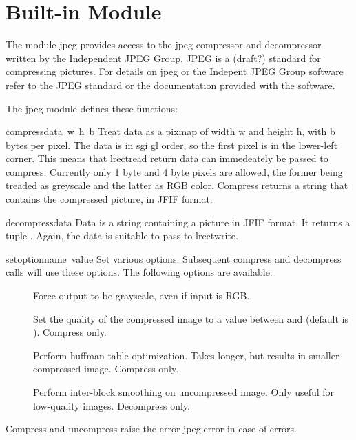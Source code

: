 \section{Built-in Module }

The module jpeg provides access to the jpeg compressor and
decompressor written by the Independent JPEG Group. JPEG is a (draft?)
standard for compressing pictures.  For details on jpeg or the
Indepent JPEG Group software refer to the JPEG standard or the
documentation provided with the software.

The jpeg module defines these functions:

\renewcommand{\indexsubitem}{(in module jpeg)}
\begin{funcdesc}{compress}{data\, w\, h\, b}
Treat data as a pixmap of width w and height h, with b bytes per
pixel.  The data is in sgi gl order, so the first pixel is in the
lower-left corner. This means that lrectread return data can
immedeately be passed to compress.  Currently only 1 byte and 4 byte
pixels are allowed, the former being treaded as greyscale and the
latter as RGB color.  Compress returns a string that contains the
compressed picture, in JFIF format.
\end{funcdesc}

\begin{funcdesc}{decompress}{data}
Data is a string containing a picture in JFIF format. It returns a
tuple
.
Again, the data is suitable to pass to lrectwrite.
\end{funcdesc}

\begin{funcdesc}{setoption}{name\, value}
Set various options.  Subsequent compress and decompress calls
will use these options.  The following options are available:
\begin{description}
\item[]
Force output to be grayscale, even if input is RGB.

\item[]
Set the quality of the compressed image to a
value between  and  (default is ).  Compress only.

\item[]
Perform huffman table optimization.  Takes longer, but results in
smaller compressed image.  Compress only.

\item[]
Perform inter-block smoothing on uncompressed image.  Only useful for
low-quality images.  Decompress only.
\end{description}
\end{funcdesc}

Compress and uncompress raise the error jpeg.error in case of errors.
